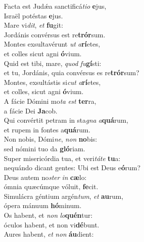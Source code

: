 \evenverse Facta est Judǽa sanctificá\textit{ti}\textit{o} \textbf{e}jus,~\*\\
\evenverse Israël potéstas \textbf{e}jus.\\
\oddverse Mare vi\textit{dit}, \textit{et} \textbf{fu}git:~\*\\
\oddverse Jordánis convérsus est re\textbf{trór}sum.\\
\evenverse Montes exsultavérunt \textit{ut} \textit{a}\textbf{rí}etes,~\*\\
\evenverse et colles sicut agni \textbf{ó}vium.\\
\oddverse Quid est tibi, mare, \textit{quod} \textit{fu}\textbf{gí}sti:~\*\\
\oddverse et tu, Jordánis, quia convérsus es re\textbf{trór}sum?\\
\evenverse Montes, exsultástis si\textit{cut} \textit{a}\textbf{rí}etes,~\*\\
\evenverse et colles, sicut agni \textbf{ó}vium.\\
\oddverse A fácie Dómini mo\textit{ta} \textit{est} \textbf{ter}ra,~\*\\
\oddverse a fácie Dei \textbf{Ja}cob.\\
\evenverse Qui convértit petram in sta\textit{gna} \textit{a}\textbf{quá}rum,~\*\\
\evenverse et rupem in fontes a\textbf{quá}rum.\\
\oddverse Non nobis, Dómi\textit{ne}, \textit{non} \textbf{no}bis:~\*\\
\oddverse sed nómini tuo da \textbf{gló}riam.\\
\evenverse Super misericórdia tua, et veri\textit{tá}\textit{te} \textbf{tu}a:~\*\\
\evenverse nequándo dicant gentes: Ubi est Deus e\textbf{ó}rum?\\
\oddverse Deus autem no\textit{ster} \textit{in} \textbf{cæ}lo:~\*\\
\oddverse ómnia quæcúmque vóluit, \textbf{fe}cit.\\
\evenverse Simulácra géntium argén\textit{tum}, \textit{et} \textbf{au}rum,~\*\\
\evenverse ópera mánuum \textbf{hó}minum.\\
\oddverse Os habent, et \textit{non} \textit{lo}\textbf{quén}tur:~\*\\
\oddverse óculos habent, et non vi\textbf{dé}bunt.\\
\evenverse Aures habent, \textit{et} \textit{non} \textbf{áu}dient:~\*\\
